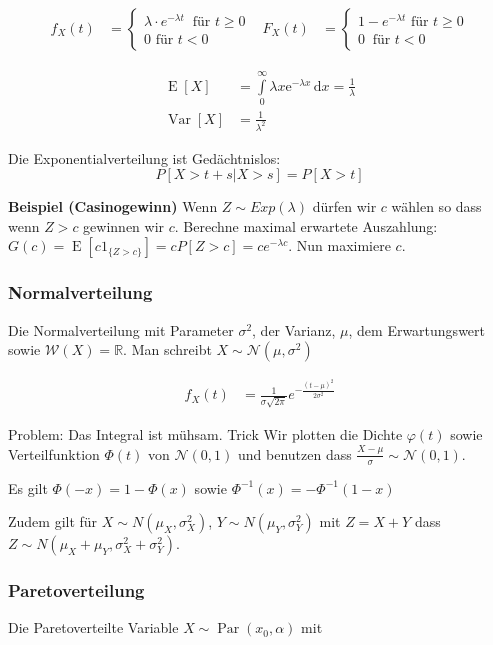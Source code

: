\documentclass[25pt]{sciposter}
\newcommand{\R}{\mathbb{R}}
\newcommand{\W}{\mathcal{W}}
\newcommand{\Nor}{\mathcal{N}}
\newcommand{\Var}{\operatorname{Var}}
\newcommand{\E}{\operatorname{E}}
\begin{document}
\begin{multicols}{3}
\begin{align*}
f_X(t) &= \begin{cases}
\lambda \cdot e^{-\lambda t} \ \text{ für } t \geq 0\\
0 \text{ für } t < 0
\end{cases}
& 
F_X(t) &= \begin{cases}
1-e^{-\lambda t} \text{ für } t\geq 0\\
0 \ \text{ für } t < 0
\end{cases}
\end{align*}

\begin{align*}
	\E[X]&=\int \limits _{0}^{\infty }\lambda x{\mathrm  {e}}^{{-\lambda x}}\,{\mathrm  {d}}x={\frac  {1}{\lambda }}\\
	\Var[X] &= \frac{1}{\lambda^2}
\end{align*}

Die Exponentialverteilung ist Gedächtnislos: 
$$P[X > t+s| X > s] = P[X > t]$$

\textbf{Beispiel (Casinogewinn)} Wenn $Z\sim Exp(\lambda)$ dürfen wir $c$ wählen so dass wenn $Z > c$ gewinnen wir $c$. Berechne maximal erwartete Auszahlung: $G(c) = \E[c1_{\{Z > c\}}] = cP[Z > c] = ce^{-\lambda c}$. Nun maximiere $c$.

\subsubsection*{Normalverteilung}
Die Normalverteilung mit Parameter $\sigma^2$, der Varianz, $\mu$, dem Erwartungswert sowie $\W(X) = \R$. Man schreibt $X\sim \Nor(\mu,\sigma^2)$

\begin{align*}
f_X(t) &= \frac{1}{\sigma\sqrt{2\pi}}e^{-\frac{(t-\mu)^2}{2\sigma^2}}
\end{align*}

Problem: Das Integral ist mühsam. Trick Wir plotten die Dichte $\varphi(t)$ sowie Verteilfunktion $\Phi(t)$ von $\Nor(0,1)$ und benutzen dass $\frac{X-\mu}{\sigma} \sim \Nor(0,1)$.

Es gilt $\Phi(-x) = 1 - \Phi(x)$ sowie ${\Phi^{-1}(x) = -\Phi^{-1}(1-x)}$


Zudem gilt für $X\sim N(\mu_X,\sigma^2_X)$, $Y \sim N(\mu_Y, \sigma^2_Y)$ mit $Z=X+Y$ dass $Z \sim N(\mu_X+\mu_Y, \sigma^2_X + \sigma^2_Y)$.


\subsubsection*{Paretoverteilung}
Die Paretoverteilte Variable $X\sim\operatorname{Par}(x_0,\alpha)$ mit 


\end{multicols}
\end{document}
